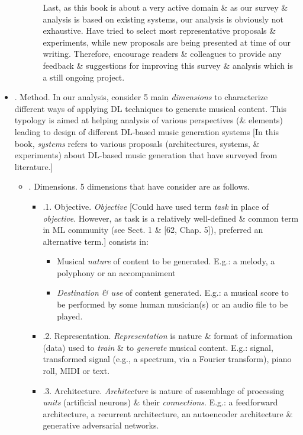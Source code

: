 \documentclass{article}
\begin{document}
\begin{itemize}
\begin{itemize}
\begin{itemize}
			Last, as this book is about a very active domain \& as our survey \& analysis is based on existing systems, our analysis is obviously not exhaustive. Have tried to select most representative proposals \& experiments, while new proposals are being presented at time of our writing. Therefore, encourage readers \& colleagues to provide any feedback \& suggestions for improving this survey \& analysis which is a still ongoing project.
		\end{itemize}
	\end{itemize}
	\item {. Method.} In our analysis, consider 5 main {\it dimensions} to characterize different ways of applying DL techniques to generate musical content. This typology is aimed at helping analysis of various perspectives (\& elements) leading to design of different DL-based music generation systems [In this book, {\it systems} refers to various proposals (architectures, systems, \& experiments) about DL-based music generation that have surveyed from literature.]
	\begin{itemize}
		\item {. Dimensions.} 5 dimensions that have consider are as follows.
		\begin{itemize}
			\item {.1. Objective.} {\it Objective} [Could have used term {\it task} in place of {\it objective}. However, as task is a relatively well-defined \& common term in ML community (see Sect. 1 \& [62, Chap. 5]), preferred an alternative term.] consists in:
			\begin{itemize}
				\item Musical {\it nature} of content to be generated. E.g.: a melody, a polyphony or an accompaniment
				\item {\it Destination \& use} of content generated. E.g.: a musical score to be performed by some human musician(s) or an audio file to be played.
			\end{itemize}
			\item {.2. Representation.} {\it Representation} is nature \& format of information (data) used to {\it train} \& to {\it generate} musical content. E.g.: signal, transformed signal (e.g., a spectrum, via a Fourier transform), piano roll, MIDI or text.
			\item {.3. Architecture.} {\it Architecture} is nature of assemblage of processing {\it units} (artificial neurons) \& their {\it connections}. E.g.: a feedforward architecture, a recurrent architecture, an autoencoder architecture \& generative adversarial networks.
			

\end{itemize}
\end{itemize}
\end{itemize}
\end{document}
